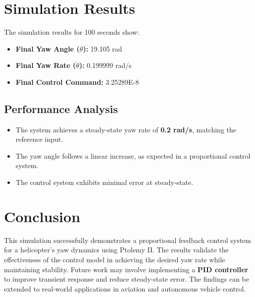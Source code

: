 \documentclass{article}
\begin{document}
\section{Simulation Results}
The simulation results for 100 seconds show:
\begin{itemize}
    \item \textbf{Final Yaw Angle ($\theta$):} 19.105 rad
    \item \textbf{Final Yaw Rate ($\dot{\theta}$):} 0.199999 rad/s
    \item \textbf{Final Control Command:} 3.25289E-8
\end{itemize}

\subsection{Performance Analysis}
\begin{itemize}
    \item The system achieves a steady-state yaw rate of \textbf{0.2 rad/s}, matching the reference input.
    \item The yaw angle follows a linear increase, as expected in a proportional control system.
    \item The control system exhibits minimal error at steady-state.
\end{itemize}

\section{Conclusion}
This simulation successfully demonstrates a proportional feedback control system for a helicopter's yaw dynamics using Ptolemy II. The results validate the effectiveness of the control model in achieving the desired yaw rate while maintaining stability. Future work may involve implementing a \textbf{PID controller} to improve transient response and reduce steady-state error. The findings can be extended to real-world applications in aviation and autonomous vehicle control.
\end{document}
